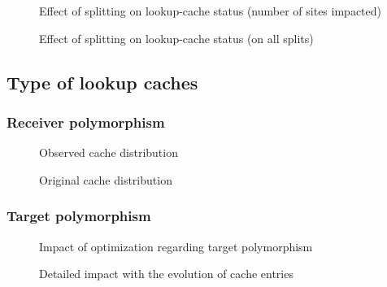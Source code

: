 \documentclass[preprint]{acmart}
\begin{document}
\begin{figure}[h]
  \centering
  \EffectSplittingSites
  \caption{
    Effect of splitting on lookup-cache status (number of sites impacted)}
\end{figure}

\begin{figure}[h]
  \centering
  \EffectSplittingFrequency
  \caption{
    Effect of splitting on lookup-cache status (on all splits)}
\end{figure}


\subsection{Type of lookup caches}

\subsubsection{Receiver polymorphism}

\begin{figure}[h!]
  \centering
  \CacheDistribObservedSplitting
  \caption{
    Observed cache distribution}
\end{figure}


\begin{figure}[h!]
  \centering
  \CacheDistribOriginalSplitting
  \caption{
    Original cache distribution}
\end{figure}


\subsubsection{Target polymorphism}

\begin{figure}[h!]
  \centering
  \TargetPolymorphism
  \caption{
    Impact of optimization regarding target polymorphism}
\end{figure}

\begin{landscape}
\begin{figure}[h]
  \centering
  \TargetPolymorphismDetails
  \caption{
    Detailed impact with the evolution of cache entries}
\end{figure}
\end{landscape}


%
%
\end{document}
